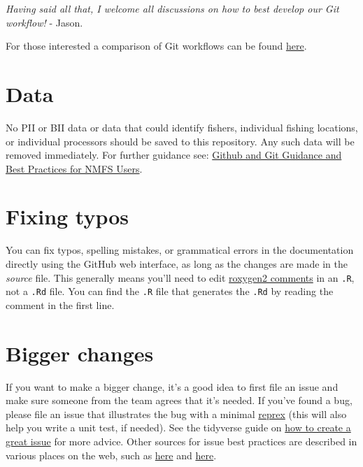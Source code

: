 \documentclass[
  letterpaper,
  DIV=11,
  numbers=noendperiod]{scrreprt}
\begin{document}
\emph{Having said all that, I welcome all discussions on how to best
develop our Git workflow!} - Jason.

For those interested a comparison of Git workflows can be found
\href{https://www.atlassian.com/git/tutorials/comparing-workflows}{here}.

\section{Data}\label{data-1}

No PII or BII data or data that could identify fishers, individual
fishing locations, or individual processors should be saved to this
repository. Any such data will be removed immediately. For further
guidance see: \href{https://nmfs-opensci.github.io/GitHub-Guide/}{Github
and Git Guidance and Best Practices for NMFS Users}.

\section{Fixing typos}\label{fixing-typos}

You can fix typos, spelling mistakes, or grammatical errors in the
documentation directly using the GitHub web interface, as long as the
changes are made in the \emph{source} file. This generally means you'll
need to edit
\href{https://roxygen2.r-lib.org/articles/roxygen2.html}{roxygen2
comments} in an \texttt{.R}, not a \texttt{.Rd} file. You can find the
\texttt{.R} file that generates the \texttt{.Rd} by reading the comment
in the first line.

\section{Bigger changes}\label{bigger-changes}

If you want to make a bigger change, it's a good idea to first file an
issue and make sure someone from the team agrees that it's needed. If
you've found a bug, please file an issue that illustrates the bug with a
minimal \href{https://www.tidyverse.org/help/\#reprex}{reprex} (this
will also help you write a unit test, if needed). See the tidyverse
guide on \href{https://code-review.tidyverse.org/issues/}{how to create
a great issue} for more advice. Other sources for issue best practices
are described in various places on the web, such as
\href{https://medium.com/nyc-planning-digital/writing-a-proper-github-issue-97427d62a20f}{here}
and
\href{https://rewind.com/blog/best-practices-for-using-github-issues/}{here}.
\end{document}
